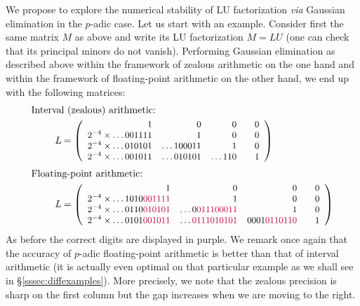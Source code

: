 \documentclass[11pt]{article}
\numberwithin{equation}{section}
\numberwithin{figure}{section}
\theoremstyle{definition}
\begin{document}
We propose to explore the numerical stability of LU factorization 
\emph{via} Gaussian elimination in the $p$-adic case. Let us start with 
an example. Consider first the same matrix $M$ as above and write its LU 
factorization $M = LU$ (one can check that its principal minors do not 
vanish). Performing Gaussian elimination as described above within the 
framework of zealous arithmetic on the one hand and within the framework 
of floating-point arithmetic on the other hand, we end up with the 
following matrices:
\begin{equation}
\label{eq:resultLU}
\begin{array}{cr@{\hspace{0.5ex}}l}
\multicolumn{3}{l}{\text{Interval (zealous) arithmetic:}}\smallskip\\
\hspace{5mm}\null 
& L & = 
\small \left(\begin{array}{rrr@{\hspace{2em}}r}
1 & 0 & 0 & 0 \\
2^{-4} \times \ldots001111 & 1 & 0 & 0 \\
2^{-4} \times \ldots010101 & \ldots100011 & 1 & 0 \\
2^{-4} \times \ldots001011 & \ldots010101 & \ldots110 & 1
\end{array}\right) \medskip \\
\multicolumn{3}{l}{\text{Floating-point arithmetic:}}\smallskip\\
\hspace{5mm}\null 
& L & = 
\small \left(\begin{array}{rrr@{\hspace{2em}}r}
1 & 0 & 0 & 0 \\
2^{-4} \times \ldots1010{\color{purple}001111} & 1 & 0 & 0 \\
2^{-4} \times \ldots0110{\color{purple}010101} & \ldots{0\color{purple}011100011} & 1 & 0 \\
2^{-4} \times \ldots0101{\color{purple}001011} & \ldots{\color{purple}0111010101} & 0001{\color{purple}0110110} & 1
\end{array}\right)
\end{array}
\end{equation}
As before the correct digits are displayed in purple. We remark once
again that the accuracy of $p$-adic floating-point arithmetic is better 
than that of interval arithmetic (it is actually even optimal on that
particular example as we shall see in \S \ref{sssec:diffexamples}).
More precisely, we note that the
zealous precision is sharp on the first column but the gap increases
when we are moving to the right.
\end{document}
